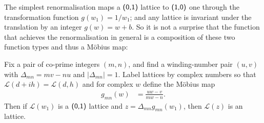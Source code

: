 The simplest renormalisation maps a $\textsf{(0,1)}$ lattice to $\textsf{(1,0)}$ one through the transformation  function $g(w_1)=1/w_1$; and any lattice is invariant under the translation by an integer $g(w)=w+b$. So it is not a surprise that 
 the function that achieves the renormalisation in general is a composition of these two function types and thus a M\"obius map:
\begin{theorem}
		\label{thm:renormalization}
	Fix a pair of co-prime integers $(m,n)$,  and find a winding-number pair $(u,v)$ with  $\Delta_{mn}=mv-nu$ and $|\Delta_{mn}|=1$. Label lattices by complex numbers so that  $\mathcal{L}(d+ih)=\mathcal{L}(d,h)$ and for complex $w$ define the M\"obius map
	\begin{align}
		\label{eq:gDefinition}
		g_{mn}(w)& = \frac{ u   w- v}{ m  w   -n}.
	\end{align}
Then if	$\mathcal{L}(w_1)$ is a $\textsf{(0,1)}$ lattice and $z= \Delta_{mn} g_{mn}(w_1)$,   then $\mathcal{L}(z)$ is an  lattice.  
\end{theorem}

